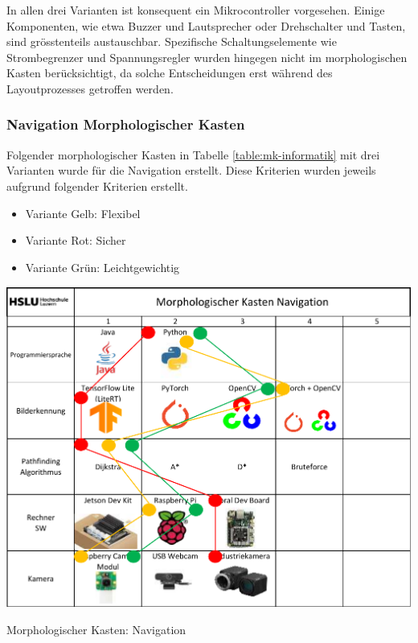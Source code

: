 In allen drei Varianten ist konsequent ein Mikrocontroller vorgesehen. Einige Komponenten, wie etwa Buzzer und Lautsprecher oder Drehschalter und Tasten, sind grösstenteils austauschbar. Spezifische Schaltungselemente wie Strombegrenzer und Spannungsregler wurden hingegen nicht im morphologischen Kasten berücksichtigt, da solche Entscheidungen erst während des Layoutprozesses getroffen werden.


\subsubsection*{Navigation Morphologischer Kasten}


Folgender morphologischer Kasten in Tabelle \ref{table:mk-informatik} mit drei Varianten wurde für die Navigation erstellt.  Diese Kriterien wurden jeweils aufgrund folgender Kriterien erstellt.

\begin{itemize}
    \item Variante Gelb: Flexibel
    \item Variante Rot: Sicher
    \item Variante Grün: Leichtgewichtig
\end{itemize}

\begin{table}[H]
\centering
\includegraphics[width=\textwidth]{assets/MK_Informatik.pdf}
\caption{Morphologischer Kasten: Navigation}
\label{table:mk-informatik}
\end{table}


